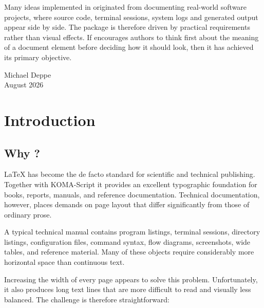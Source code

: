 \documentclass[
11pt,
a4paper,
oneside
]{scrbook}
\begin{document}
Many ideas implemented in \mdlayout{} originated from documenting
real-world software projects, where source code, terminal sessions,
system logs and generated output appear side by side. The package is
therefore driven by practical requirements rather than visual effects.
If \mdlayout{} encourages authors to think first about the meaning of a
document element before deciding how it should look, then it has
achieved its primary objective.

\bigskip
\bigskip

\begin{flushright}
	Michael Deppe\\
	August 2026
\end{flushright}


\chapter{Introduction}
\label{chap:Introduction}

\section{Why \mdlayout{}?}

\begin{MarginFigure}
\end{MarginFigure}

\noindent
\LaTeX{} has become the de facto standard for scientific and technical
publishing.
Together with KOMA-Script it provides an excellent typographic foundation for
books, reports, manuals, and reference documentation.
Technical documentation, however, places demands on page layout that differ
significantly from those of ordinary prose.

A typical technical manual contains program listings, terminal sessions,
directory listings, configuration files, command syntax, flow diagrams,
screenshots, wide tables, and reference material.
Many of these objects require considerably more horizontal space than
continuous text.

Increasing the width of every page appears to solve this problem.
Unfortunately, it also produces long text lines that are more difficult to
read and visually less balanced.
The challenge is therefore straightforward:
\end{document}
